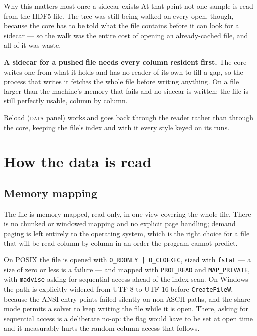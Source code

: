 \documentclass[11pt,a4paper,oneside]{report}
\newcommand{\code}[1]{\texttt{#1}}
\begin{document}
\begin{aoenote}{Why this matters most once a sidecar exists}
At that point not one sample is read from the HDF5 file. The tree was still
being walked on every open, though, because the core has to be told what the
file contains before it can look for a sidecar --- so the walk was the entire
cost of opening an already-cached file, and all of it was waste.
\end{aoenote}

\begin{aoelimit}
\textbf{A sidecar for a pushed file needs every column resident first.} The
core writes one from what it holds and has no reader of its own to fill a gap,
so the process that writes it fetches the whole file before writing anything.
On a file larger than the machine's memory that fails and no sidecar is
written; the file is still perfectly usable, column by column.
\end{aoelimit}

Reload (\textsc{data} panel) works and goes back through the reader rather than
through the core, keeping the file's index and with it every style keyed on its
runs.

\chapter{How the data is read}
\label{ch:reading}

\section{Memory mapping}

The file is memory-mapped, read-only, in one view covering the whole file. There
is no chunked or windowed mapping and no explicit page handling; demand paging is
left entirely to the operating system, which is the right choice for a file that
will be read column-by-column in an order the program cannot predict.

On POSIX the file is opened with \code{O\_RDONLY | O\_CLOEXEC}, sized with
\code{fstat} --- a size of zero or less is a failure --- and mapped with
\code{PROT\_READ} and \code{MAP\_PRIVATE}, with \code{madvise} asking for
sequential access ahead of the index scan. On Windows the path is explicitly
widened from UTF-8 to UTF-16 before \code{CreateFileW}, because the ANSI entry
points failed silently on non-ASCII paths, and the share mode permits a solver to
keep writing the file while it is open. There, asking for sequential access is a
deliberate no-op: the flag would have to be set at open time and it measurably
hurts the random column access that follows.
\end{document}
